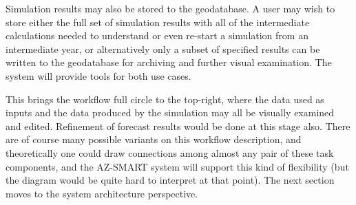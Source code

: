 Simulation results may also be stored to the geodatabase.  A user
may wish to store either the full set of simulation results with all
of the intermediate calculations needed to understand or even
re-start a simulation from an intermediate year, or alternatively
only a subset of specified results can be written to the geodatabase
for archiving and further visual examination.  The system will
provide tools for both use cases.

This brings the workflow full circle to the top-right, where the data used as inputs and the data produced by the simulation may all
be visually examined and edited.  Refinement of forecast results would be done at this stage also.  There are of course many possible
variants on this workflow description, and theoretically one could draw connections among almost any pair of these task components,
and the AZ-SMART system will support this kind of flexibility (but the diagram would be quite hard to interpret at that point).  The
next section moves to the system architecture perspective.
